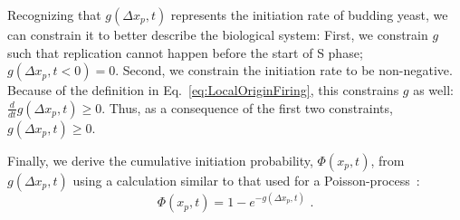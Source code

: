 		Recognizing that $g(\Delta x_p,t)$ represents the initiation rate of budding yeast, we can constrain it to better describe the biological system:
		First, we constrain $g$ such that replication cannot happen before the start of S phase; $g(\Delta x_p,t<0)=0$.
		Second, we constrain the initiation rate to be non-negative. Because of the definition in Eq.~\ref{eq:LocalOriginFiring}, this constrains $g$ as well: $\frac{d}{dt}g(\Delta x_p,t)\geq 0$.
		Thus, as a consequence of the first two constraints, $g(\Delta x_p,t)\geq 0$.
		
		Finally, we derive the cumulative initiation probability, $\Phi(x_p,t)$, from $g(\Delta x_p,t)$ using a calculation similar to that used for a Poisson-process~\cite{Spikes}:
		\begin{equation} \label{eq:PhiFromG}
			\Phi\left( x_p,t\right) = 1 - e^{-g\left(\Delta x_p,t\right)} \text{ .}
		\end{equation}
